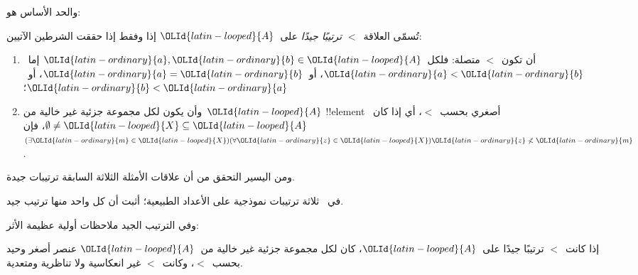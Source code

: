 \documentclass[../../../include/open-logic-section]{subfiles}
\begin{document}

والحد الأساس هو:

\begin{defn}
تُسمّى العلاقة~$<$ \emph{ترتيبًا جيدًا} على~$\OLId{latin-looped}{A}$ إذا وفقط إذا حققت
الشرطين الآتيين:
\begin{enumerate}
\item أن تكون~$<$ متصلة: فلكل~$\OLId{latin-ordinary}{a}, \OLId{latin-ordinary}{b} \in \OLId{latin-looped}{A}$ إما~$\OLId{latin-ordinary}{a} < \OLId{latin-ordinary}{b}$،
	أو~$\OLId{latin-ordinary}{a} = \OLId{latin-ordinary}{b}$، أو~$\OLId{latin-ordinary}{b} < \OLId{latin-ordinary}{a}$؛
\item وأن يكون لكل مجموعة جزئية غير خالية من~$\OLId{latin-looped}{A}$ !!{element} أصغري بحسب~$<$،
	أي إذا كان~$\emptyset \neq \OLId{latin-looped}{X} \subseteq \OLId{latin-looped}{A}$، فإن
	$(\exists \OLId{latin-ordinary}{m} \in \OLId{latin-looped}{X})(\forall \OLId{latin-ordinary}{z} \in \OLId{latin-looped}{X})\OLId{latin-ordinary}{z} \nless \OLId{latin-ordinary}{m}$.
\end{enumerate}
\end{defn}

ومن اليسير التحقق من أن علاقات الأمثلة الثلاثة السابقة ترتيبات جيدة.

\begin{prob}
في~ ثلاثة ترتيبات نموذجية على الأعداد
الطبيعية؛ أثبت أن كل واحد منها ترتيب جيد.
\end{prob}

وفي الترتيب الجيد ملاحظات أولية عظيمة الأثر:

\begin{prop}
إذا كانت~$<$ ترتيبًا جيدًا على~$\OLId{latin-looped}{A}$، كان لكل مجموعة جزئية غير خالية من~$\OLId{latin-looped}{A}$
عنصر أصغر وحيد بحسب~$<$، وكانت~$<$ غير انعكاسية ولا تناظرية ومتعدية.
\end{prop}
\end{document}
